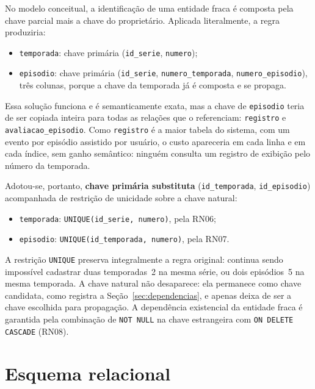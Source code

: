 \documentclass[a4paper,12pt,oneside,openany]{book}
\newif\iforientacoes
\newcommand{\orientacao}[1]{%
    \iforientacoes
        \begin{quote}
        \small\itshape\textbf{Orientação:} #1
        \end{quote}
    \fi
}
\newcommand{\id}[1]{\texttt{#1}}
\begin{document}
No modelo conceitual, a identificação de uma entidade fraca é composta pela chave
parcial mais a chave do proprietário. Aplicada literalmente, a regra produziria:

\begin{itemize}[nosep]
    \item \id{temporada}: chave primária (\id{id\_serie}, \id{numero});
    \item \id{episodio}: chave primária (\id{id\_serie}, \id{numero\_temporada},
\id{numero\_episodio}), três colunas, porque a chave da temporada já é composta e se
propaga.
\end{itemize}

Essa solução funciona e é semanticamente exata, mas a chave de \id{episodio} teria de
ser copiada inteira para todas as relações que o referenciam: \id{registro} e
\id{avaliacao\_episodio}. Como \id{registro} é a maior tabela do sistema, com um
evento por episódio assistido por usuário, o custo apareceria em cada linha e em
cada índice, sem ganho semântico: ninguém consulta um registro de exibição pelo
número da temporada.

Adotou-se, portanto, \textbf{chave primária substituta} (\id{id\_temporada},
\id{id\_episodio}) acompanhada de restrição de unicidade sobre a chave natural:

\begin{itemize}[nosep]
    \item \id{temporada}: \id{UNIQUE(id\_serie, numero)}, pela RN06;
    \item \id{episodio}: \id{UNIQUE(id\_temporada, numero)}, pela RN07.
\end{itemize}

A restrição \id{UNIQUE} preserva integralmente a regra original: continua sendo
impossível cadastrar duas temporadas~2 na mesma série, ou dois episódios~5 na mesma
temporada. A chave natural não desaparece: ela permanece como chave candidata, como
registra a Seção~\ref{sec:dependencias}, e apenas deixa de ser a chave escolhida
para propagação. A dependência existencial da entidade fraca é
garantida pela combinação de \id{NOT NULL} na chave estrangeira com \id{ON DELETE
CASCADE} (RN08).

\section{Esquema relacional}\label{sec:esquema-relacional}

\orientacao{Apresentem o esquema na notação
$R(\underline{\text{chave}}, \text{atributo}, \dots)$, com chaves estrangeiras
indicadas. São 17 relações. Os nomes de tabela e de coluna estão fixados no
Capítulo~\ref{cap:conceitual} e não devem ser alterados sem atualizar aquele
capítulo. A lista abaixo enumera as relações esperadas, na ordem em que devem ser
apresentadas.}
\end{document}
